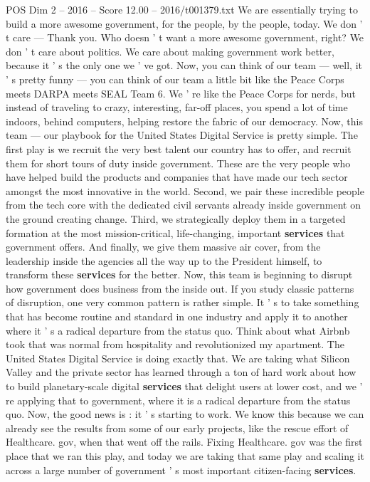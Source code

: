 \begin{textsample}{POS Dim 2 – 2016 – Score 12.00 – 2016/t001379.txt}
We are essentially trying to build a more awesome government, for the people, by the people, today.
We don ' t care — Thank you.
Who doesn ' t want a more awesome government, right?
We don ' t care about politics.
We care about making government work better, because it ' s the only one we ' ve got.
Now, you can think of our team — well, it ' s pretty funny — you can think of our team a little bit like the Peace Corps meets DARPA meets SEAL Team 6.
We ' re like the Peace Corps for nerds, but instead of traveling to crazy, interesting, far-off places, you spend a lot of time indoors, behind computers, helping restore the fabric of our democracy.
Now, this team — our playbook for the United States Digital Service is pretty simple.
The first play is we recruit the very best talent our country has to offer, and recruit them for short tours of duty inside government.
These are the very people who have helped build the products and companies that have made our tech sector amongst the most innovative in the world.
Second, we pair these incredible people from the tech core with the dedicated civil servants already inside government on the ground creating change.
Third, we strategically deploy them in a targeted formation at the most mission-critical, life-changing, important \textbf{services} that government offers.
And finally, we give them massive air cover, from the leadership inside the agencies all the way up to the President himself, to transform these \textbf{services} for the better.
Now, this team is beginning to disrupt how government does business from the inside out.
If you study classic patterns of disruption, one very common pattern is rather simple.
It ' s to take something that has become routine and standard in one industry and apply it to another where it ' s a radical departure from the status quo.
Think about what Airbnb took that was normal from hospitality and revolutionized my apartment.
The United States Digital Service is doing exactly that.
We are taking what Silicon Valley and the private sector has learned through a ton of hard work about how to build planetary-scale digital \textbf{services} that delight users at lower cost, and we ' re applying that to government, where it is a radical departure from the status quo.
Now, the good news is : it ' s starting to work.
We know this because we can already see the results from some of our early projects, like the rescue effort of Healthcare. gov, when that went off the rails.
Fixing Healthcare. gov was the first place that we ran this play, and today we are taking that same play and scaling it across a large number of government ' s most important citizen-facing \textbf{services}.

\end{textsample}
